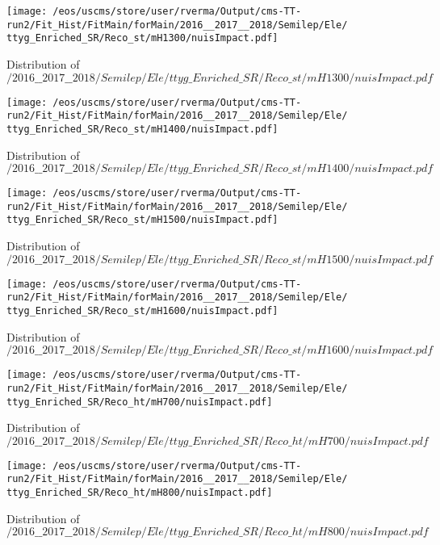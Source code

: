 \begin{figure}
\centering
\texttt{[image: /eos/uscms/store/user/rverma/Output/cms-TT-run2/Fit\_Hist/FitMain/forMain/2016\_\_2017\_\_2018/Semilep/Ele/ttyg\_Enriched\_SR/Reco\_st/mH1300/nuisImpact.pdf]}
\caption{Distribution of $/2016\_\_2017\_\_2018/Semilep/Ele/ttyg\_Enriched\_SR/Reco\_st/mH1300/nuisImpact.pdf$}
\end{figure}

\begin{figure}
\centering
\texttt{[image: /eos/uscms/store/user/rverma/Output/cms-TT-run2/Fit\_Hist/FitMain/forMain/2016\_\_2017\_\_2018/Semilep/Ele/ttyg\_Enriched\_SR/Reco\_st/mH1400/nuisImpact.pdf]}
\caption{Distribution of $/2016\_\_2017\_\_2018/Semilep/Ele/ttyg\_Enriched\_SR/Reco\_st/mH1400/nuisImpact.pdf$}
\end{figure}

\begin{figure}
\centering
\texttt{[image: /eos/uscms/store/user/rverma/Output/cms-TT-run2/Fit\_Hist/FitMain/forMain/2016\_\_2017\_\_2018/Semilep/Ele/ttyg\_Enriched\_SR/Reco\_st/mH1500/nuisImpact.pdf]}
\caption{Distribution of $/2016\_\_2017\_\_2018/Semilep/Ele/ttyg\_Enriched\_SR/Reco\_st/mH1500/nuisImpact.pdf$}
\end{figure}

\begin{figure}
\centering
\texttt{[image: /eos/uscms/store/user/rverma/Output/cms-TT-run2/Fit\_Hist/FitMain/forMain/2016\_\_2017\_\_2018/Semilep/Ele/ttyg\_Enriched\_SR/Reco\_st/mH1600/nuisImpact.pdf]}
\caption{Distribution of $/2016\_\_2017\_\_2018/Semilep/Ele/ttyg\_Enriched\_SR/Reco\_st/mH1600/nuisImpact.pdf$}
\end{figure}

\begin{figure}
\centering
\texttt{[image: /eos/uscms/store/user/rverma/Output/cms-TT-run2/Fit\_Hist/FitMain/forMain/2016\_\_2017\_\_2018/Semilep/Ele/ttyg\_Enriched\_SR/Reco\_ht/mH700/nuisImpact.pdf]}
\caption{Distribution of $/2016\_\_2017\_\_2018/Semilep/Ele/ttyg\_Enriched\_SR/Reco\_ht/mH700/nuisImpact.pdf$}
\end{figure}

\begin{figure}
\centering
\texttt{[image: /eos/uscms/store/user/rverma/Output/cms-TT-run2/Fit\_Hist/FitMain/forMain/2016\_\_2017\_\_2018/Semilep/Ele/ttyg\_Enriched\_SR/Reco\_ht/mH800/nuisImpact.pdf]}
\caption{Distribution of $/2016\_\_2017\_\_2018/Semilep/Ele/ttyg\_Enriched\_SR/Reco\_ht/mH800/nuisImpact.pdf$}
\end{figure}

